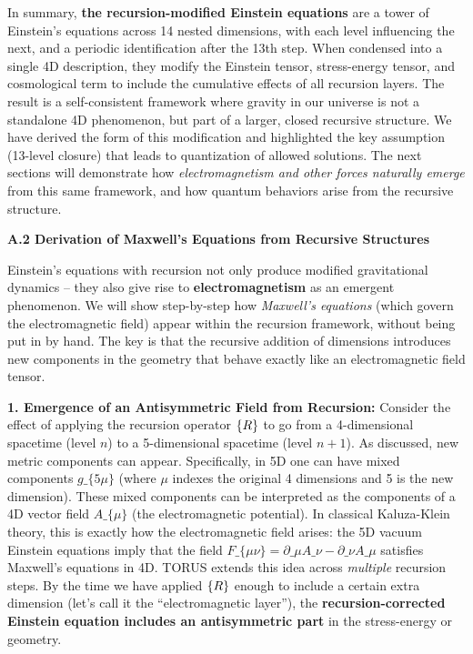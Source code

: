 \documentclass[]{article}
\begin{document}
In summary, \textbf{the recursion-modified Einstein equations} are a
tower of Einstein's equations across 14 nested dimensions, with each
level influencing the next, and a periodic identification after the 13th
step. When condensed into a single 4D description, they modify the
Einstein tensor, stress-energy tensor, and cosmological term to include
the cumulative effects of all recursion layers​. The result is a
self-consistent framework where gravity in our universe is not a
standalone 4D phenomenon, but part of a larger, closed recursive
structure. We have derived the form of this modification and highlighted
the key assumption (13-level closure) that leads to quantization of
allowed solutions. The next sections will demonstrate how
\emph{electromagnetism and other forces naturally emerge} from this same
framework, and how quantum behaviors arise from the recursive structure.

\textbf{A.2 Derivation of Maxwell's Equations from Recursive Structures}

Einstein's equations with recursion not only produce modified
gravitational dynamics -- they also give rise to
\textbf{electromagnetism} as an emergent phenomenon. We will show
step-by-step how \emph{Maxwell's equations} (which govern the
electromagnetic field) appear within the recursion framework, without
being put in by hand. The key is that the recursive addition of
dimensions introduces new components in the geometry that behave exactly
like an electromagnetic field tensor.

\textbf{1. Emergence of an Antisymmetric Field from Recursion:} Consider
the effect of applying the recursion operator
$\mathcal\{R\}$ to go from a 4-dimensional spacetime
(level $n$) to a 5-dimensional spacetime (level $n+1$). As
discussed, new metric components can appear. Specifically, in 5D one can
have mixed components $g\_\{5\mu\}$ (where
$\mu$ indexes the original 4 dimensions and 5 is the
new dimension). These mixed components can be interpreted as the
components of a 4D vector field $A\_\{\mu\}$ (the
electromagnetic potential). In classical Kaluza-Klein theory, this is
exactly how the electromagnetic field arises: the 5D vacuum Einstein
equations imply that the field
$F\_\{\mu\nu\} =
\partial\_\mu A\_\nu -
\partial\_\nu A\_\mu$
satisfies Maxwell's equations in
4D​. TORUS extends this idea across \emph{multiple} recursion steps. By
the time we have applied $\mathcal\{R\}$ enough to include a
certain extra dimension (let's call it the ``electromagnetic layer''),
the \textbf{recursion-corrected Einstein equation includes an
antisymmetric part} in the stress-energy or geometry.
\end{document}
